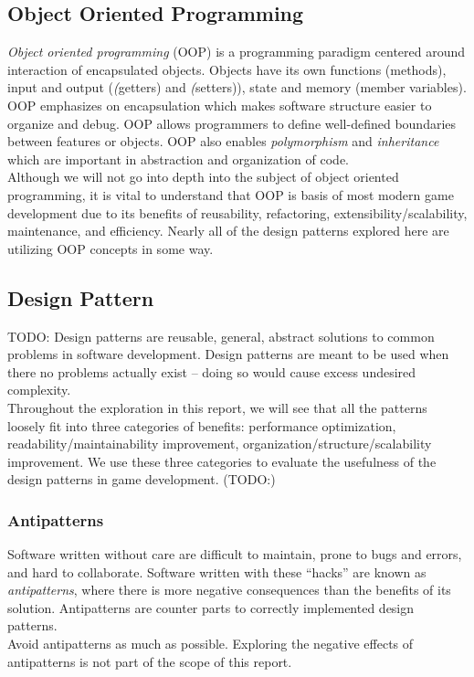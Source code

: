 \begin{multicols}{2}
\subsection{Object Oriented Programming} %

\textit{Object oriented programming} (OOP) is a programming paradigm centered around interaction of encapsulated objects. Objects have its own functions (methods), input and output (\textit(getters) and \textit(setters)), state and memory (member variables). OOP emphasizes on encapsulation which makes software structure easier to organize and debug. OOP allows programmers to define well-defined boundaries between features or objects. OOP also enables \textit{polymorphism} and \textit{inheritance} which are important in abstraction and organization of code.\cite{oop}\bs
\\
Although we will not go into depth into the subject of object oriented programming, it is vital to understand that OOP is basis of most modern game development due to its benefits of reusability, refactoring, extensibility/scalability, maintenance, and efficiency\cite{oop}. Nearly all of the design patterns explored here are utilizing OOP concepts in some way. 

\subsection{Design Pattern}

TODO:
Design patterns are reusable, general, abstract solutions to common problems in software development.\cite{sm-designpatterns} Design patterns are meant to be used when there no problems actually exist -- doing so would cause excess undesired complexity.\cite{gof}\bs
\\
Throughout the exploration in this report, we will see that all the patterns loosely fit into three categories of benefits: performance optimization, readability/maintainability improvement, organization/structure/scalability improvement. We use these three categories to evaluate the usefulness of the design patterns in game development. (TODO:)

\subsubsection{Antipatterns}
Software written without care are difficult to maintain, prone to bugs and errors, and hard to collaborate. Software written with these ``hacks'' are known as \textit{antipatterns}, where there is more negative consequences than the benefits of its solution. Antipatterns are counter parts to correctly implemented design patterns.\cite{sm-antipatterns}\bs
\\
Avoid antipatterns as much as possible. Exploring the negative effects of antipatterns is not part of the scope of this report.


\end{multicols}

